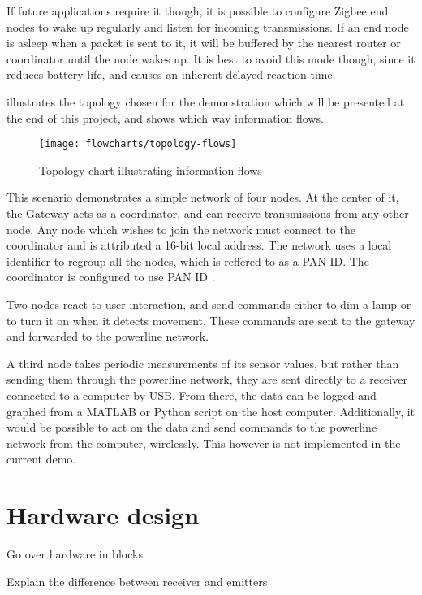 If future applications require it though, it is possible to configure Zigbee end
nodes to wake up regularly and listen for incoming transmissions. If an end node
is asleep when a packet is sent to it, it will be buffered by the nearest router
or coordinator until the node wakes up. It is best to avoid this mode though,
since it reduces battery life, and causes an inherent delayed reaction time.

 illustrates the topology chosen for the demonstration
which will be presented at the end of this project, and shows which way
information flows. 


\begin{figure}[h]
  \begin{center}
    \texttt{[image: flowcharts/topology-flows]}
  \end{center}
  \caption{Topology chart illustrating information flows}
  \label{fig:topology-flows}
\end{figure}

This scenario demonstrates a simple network of four nodes. At the center of it,
the Gateway acts as a coordinator, and can receive transmissions from any other
node. Any node which wishes to join the network must connect to the coordinator
and is attributed a 16-bit local address. The network uses a local identifier to
regroup all the nodes, which is reffered to as a PAN ID. The coordinator is
configured to use PAN ID .

Two nodes react to user interaction, and send commands either to dim a lamp or
to turn it on when it detects movement. These commands are sent to the gateway
and forwarded to the powerline network.

A third node takes periodic measurements of its sensor values, but rather than
sending them through the powerline network, they are sent directly to a receiver
connected to a computer by USB. From there, the data can be logged and graphed
from a MATLAB or Python script on the host computer. Additionally, it would be
possible to act on the data and send commands to the powerline network from the
computer, wirelessly. This however is not implemented in the current demo.


\section{Hardware design}

Go over hardware in blocks

Explain the difference between receiver and emitters

